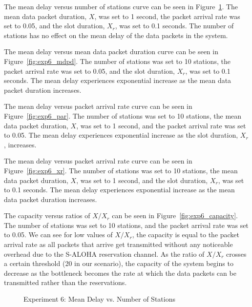The mean delay versus number of stations curve can be seen in Figure~\ref{fig:exp6_ns}. The mean data packet duration, $X$, was set to 1 second, the packet arrival rate was set to 0.05, and the slot duration, $X_r$, was set to 0.1 seconds. The number of stations has no effect on the mean delay of the data packets in the system.

The mean delay versus mean data packet duration curve can be seen in Figure~\ref{fig:exp6_mdpd}. The number of stations was set to 10 stations, the packet arrival rate was set to 0.05, and the slot duration, $X_r$, was set to 0.1 seconds. The mean delay experiences exponential increase as the mean data packet duration increases.

The mean delay versus packet arrival rate curve can be seen in Figure~\ref{fig:exp6_par}. The number of stations was set to 10 stations, the mean data packet duration, $X$, was set to 1 second, and the packet arrival rate was set to 0.05. The mean delay experiences exponential increase as the slot duration, $X_r$, increases.

The mean delay versus packet arrival rate curve can be seen in Figure~\ref{fig:exp6_xr}. The number of stations was set to 10 stations, the mean data packet duration, $X$, was set to 1 second, and the slot duration, $X_r$, was set to 0.1 seconds. The mean delay experiences exponential increase as the mean data packet duration increases.

The capacity versus ratios of $X / X_r$ can be seen in Figure~\ref{fig:exp6_capacity}. The number of stations was set to 10 stations, and the packet arrival rate was set to 0.05. We can see for low values of $X / X_r$, the capacity is equal to the packet arrival rate as all packets that arrive get transmitted without any noticeable overhead due to the S-ALOHA reservation channel. As the ratio of $X / X_r$ crosses a certain threshold (20 in our scenario), the capacity of the system begins to decrease as the bottleneck becomes the rate at which the data packets can be transmitted rather than the reservations.

\begin{figure}[h]
\centering
{}
\caption{Experiment 6: Mean Delay vs. Number of Stations}
\label{fig:exp6_ns}
\end{figure}

